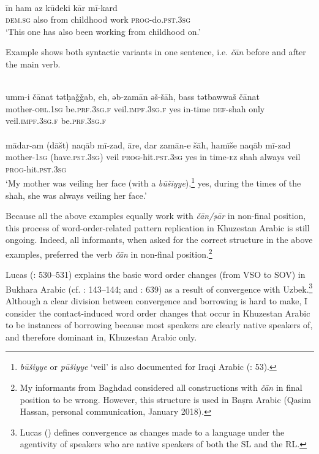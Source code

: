 \documentclass[output=paper,nonflat]{langsci/langscibook}
\begin{document}
\\
\gll īn ham az kūdeki kār mī-kard \\
     \textsc{dem.sg} also from childhood work \textsc{prog}{}-do.\textsc{pst.3sg}\\
\glt ‘This one has also been working from childhood on.’
\z\z

Example  shows both syntactic variants in one sentence, i.e. \textit{čān} before and after the main verb.

\ea\label{mother} \\
\gll umm-i čānat tətḥaǧǧab, eh, əb-zamān əš-šāh, bass tətbawwaš čānat\\
     mother-\textsc{obl.1sg} be\textsc{.prf.3sg.f} veil.\textsc{impf.3sg.f} yes in-time \textsc{def}{}-shah only veil.\textsc{impf.3sg.f} be\textsc{.prf.3sg.f}\\
 
\\
\gll mādar-am (dāšt) naqāb mī-zad, āre, dar zamān-e šāh, hamīše naqāb mī-zad \\
     mother-\textsc{1sg} (have.\textsc{pst.3sg}) veil \textsc{prog}-hit.\textsc{pst.3sg} yes in time-\textsc{ez} shah always veil \textsc{prog}-hit.\textsc{pst.3sg}\\
\glt  ‘My mother was veiling her face (with a \textit{būšiyye}),\footnote{\textit{būšiyye} or \textit{pūšiyye} ‘veil’ is also documented for Iraqi Arabic (\citealt{WoodheadEtAl1967}: 53).} yes, during the times of the shah, she was always veiling her face.’ 
\z\z

Because all the above examples equally work with \textit{čān/ṣār} in non-final position, this process of word-order-related pattern replication in Khuzestan Arabic is still ongoing. Indeed, all informants, when asked for the correct structure in the above examples, preferred the verb \textit{čān} in non-final position.\footnote{My informants from Baghdad considered all constructions with \textit{čān} in final position to be wrong. However, this structure is used in Baṣra Arabic (Qasim Hassan, personal communication, January 2018).}

Lucas (\citeyear{Lucas2015}: 530–531) explains the basic word order changes (from VSO to SOV) in Bukhara Arabic (cf. \citealt{Ratcliffe2005}: 143–144; and \citealt{Versteegh2010}: 639) as a result of convergence with Uzbek.\footnote{Lucas (\citeyear[525]{Lucas2015}) defines convergence as changes made to a language under the agentivity of speakers who are native speakers of both the SL and the RL.} Although a clear division between convergence and borrowing is hard to make, I consider the contact-induced word order changes that occur in Khuzestan Arabic to be instances of borrowing because most speakers are clearly native speakers of, and therefore dominant in, Khuzestan Arabic only.
\end{document}
